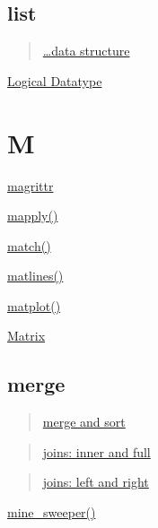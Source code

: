\documentclass[]{book}
\begin{document}
\hypertarget{list}{%
\section*{list}\label{list}}

\begin{quote}
\href{https://linkedin-learning.pxf.io/rweekly_lists}{\ldots{}data structure}
\end{quote}

\href{https://linkedin-learning.pxf.io/rweekly_atomics}{Logical Datatype}

\hypertarget{m}{%
\chapter*{M}\label{m}}

\href{https://linkedin-learning.pxf.io/rweekly_pipeline}{magrittr}

\href{https://linkedin-learning.pxf.io/mapply}{mapply()}

\href{https://linkedin-learning.pxf.io/rweekly_simplestringmatch}{match()}

\href{https://linkedin-learning.pxf.io/rweek_matplot}{matlines()}

\href{https://linkedin-learning.pxf.io/rweek_matplot}{matplot()}

\href{https://linkedin-learning.pxf.io/rweekly_matrix}{Matrix}

\hypertarget{merge}{%
\section*{merge}\label{merge}}

\begin{quote}
\href{https://linkedin-learning.pxf.io/rweekly_sortmerge}{merge and sort}
\end{quote}

\begin{quote}
\href{https://linkedin-learning.pxf.io/rweekly_innerfull}{joins: inner and full}
\end{quote}

\begin{quote}
\href{https://linkedin-learning.pxf.io/rwkly_leftrightjoin}{joins: left and right}
\end{quote}

\href{https://linkedin-learning.pxf.io/rweekly_fun}{mine\_sweeper()}
\end{document}
